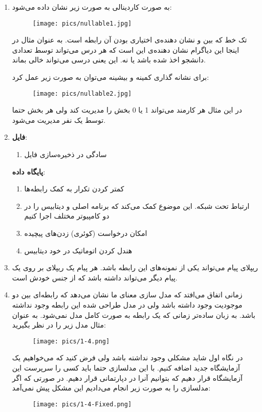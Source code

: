 \begin{enumerate}
    \item به صورت کاردینالی به صورت زیر نشان داده می‌شود:
    \begin{figure}[H]
        \centering \texttt{[image: pics/nullable1.jpg]}
    \end{figure}
    تک خط که بین
     و 
    نشان دهنده‌ی اختیاری بودن آن رابطه است. به عنوان مثال در اینجا این دیاگرام نشان دهنده‌ی این است
    که هر درس می‌تواند توسط تعدادی دانشجو اخذ شده باشد یا نه. این یعنی درسی می‌تواند خالی بماند.

    \noindent
    برای نشانه گذاری کمینه و بیشینه می‌توان به صورت زیر عمل کرد:
    \begin{figure}[H]
        \centering \texttt{[image: pics/nullable2.jpg]}
    \end{figure}
    در این مثال هر کارمند می‌تواند 1 یا 0 بخش را مدیریت کند ولی هر بخش حتما توسط یک نفر مدیریت می‌شود.
    \item \textbf{فایل}:
    \begin{enumerate}
        \item سادگی در ذخیره‌سازی فایل
    \end{enumerate}
    \textbf{پایگاه داده}:
    \begin{enumerate}
        \item کمتر کردن تکرار به کمک رابطه‌ها
        \item ارتباط تحت شبکه. این موضوع کمک می‌کند که برنامه‌ اصلی و دیتابیس را در دو کامپیوتر مختلف اجرا کنیم
        \item امکان درخواست (کوئری) زدن‌های پیچیده
        \item هندل کردن اتوماتیک  در خود دیتابیس
    \end{enumerate}
    \item ریپلای پیام می‌تواند یکی از نمونه‌های این رابطه باشد. هر پیام یک ریپلای بر روی یک پیام دیگر می‌تواند داشته باشد که از جنس خودش است.
    \item زمانی اتفاق می‌افتد که مدل سازی معنای ما نشان می‌دهد که رابطه‌ای بین دو موجودیت وجود داشته باشد ولی در مدل طراحی
    شده این رابطه وجود نداشته باشد. به زبان ساده‌تر زمانی که یک رابطه به صورت کامل مدل نمی‌شود.
    به عنوان مثال مدل زیر را در نظر بگیرید:
    \begin{figure}[H]
        \centering \texttt{[image: pics/1-4.png]}
    \end{figure}
    در نگاه اول شاید مشکلی وجود نداشته باشد ولی فرض کنید که می‌خواهیم یک آزمایشگاه جدید اضافه کنیم. با این
    مدلسازی حتما باید کسی را سرپرست این آزمایشگاه قرار دهیم که بتوانیم آنرا در دپارتمانی قرار دهیم.
    در صورتی که اگر مدلسازی را به صورت زیر انجام می‌دادیم این مشکل پیش نمی‌آمد:
    \begin{figure}[H]
        \centering \texttt{[image: pics/1-4-Fixed.png]}
    \end{figure}
\end{enumerate}



